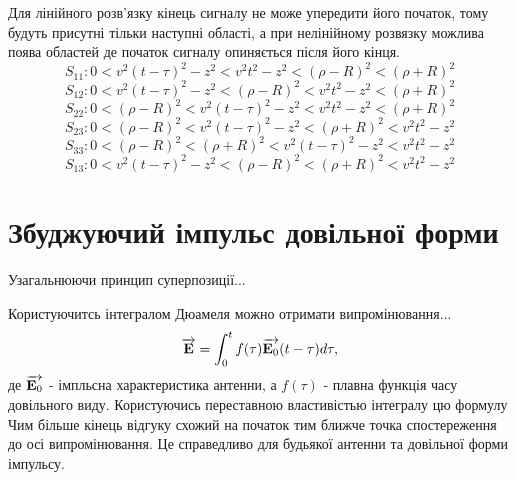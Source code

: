 %
Для лінійного розв'язку кінець сигналу не може упередити його початок, 
тому будуть присутні тільки наступні області, а при нелінійному розвязку 
можлива поява областей де початок сигналу опиняється після його кінця.
%
\begin{equation*}
S_{11}: 0 < v^2 (t-\tau)^2 - z^2 < v^2 t^2 - z^2 < 
\left( \rho - R \right)^2 < \left( \rho + R \right)^2
\end{equation*}
%
\begin{equation*}
S_{12}: 0 < v^2 (t-\tau)^2 - z^2 < \left( \rho - R \right)^2 < 
v^2 t^2 - z^2 < \left( \rho + R \right)^2
\end{equation*}
%
\begin{equation*}
S_{22}: 0 < \left( \rho - R \right)^2 < v^2 (t-\tau)^2 - z^2 < 
v^2 t^2 - z^2 < \left( \rho + R \right)^2
\end{equation*}
%
\begin{equation*}
S_{23}: 0 < \left( \rho - R \right)^2 < v^2 (t-\tau)^2 - z^2 < 
\left( \rho + R \right)^2 < v^2 t^2 - z^2 
\end{equation*}
%
\begin{equation*}
S_{33}: 0 < \left( \rho - R \right)^2 < \left( \rho + R \right)^2 <
v^2 (t-\tau)^2 - z^2 < v^2 t^2 - z^2
\end{equation*}
%
\begin{equation*}
S_{13}: 0 < v^2 (t-\tau)^2 - z^2 < \left( \rho - R \right)^2 < 
\left( \rho + R \right)^2 < v^2 t^2 - z^2
\end{equation*}

\section{Збуджуючий імпульс довільної форми}

Узагальнюючи принцип суперпозиції...

Користуючитсь інтегралом Дюамеля \cite[ст. 40]{imp:Kharkevich1950} можно 
отримати випромінювання...
%
\begin{equation}
\overrightarrow{\mathbf E} = \int_{0}^{t} f(\tau) \overrightarrow{\mathbf E_0} (t - \tau) d \tau,
\end{equation}
%
де $ \overrightarrow{\mathbf E_0} $ - імпльсна характеристика антенни, а $ f(\tau) $ - 
плавна функція часу довільного виду. Користуючись переставною властивістью 
інтегралу цю формулу
%
Чим більше кінець відгуку схожий на початок тим ближче точка спостереження
до осі випромінювання. Це справедливо для будьякої антенни та довільної форми
імпульсу.

